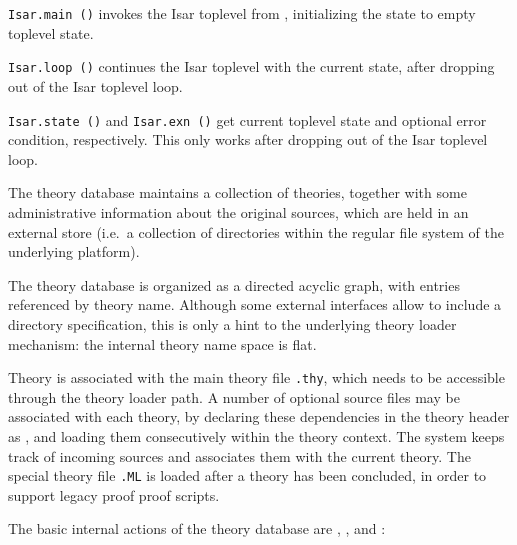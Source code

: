 \begin{isabellebody}
\begin{isamarkuptext}
  \begin{description}

  \item \verb|Isar.main ()| invokes the Isar toplevel from {\ML},
  initializing the state to empty toplevel state.

  \item \verb|Isar.loop ()| continues the Isar toplevel with the
  current state, after dropping out of the Isar toplevel loop.

  \item \verb|Isar.state ()| and \verb|Isar.exn ()| get current
  toplevel state and optional error condition, respectively.  This
  only works after dropping out of the Isar toplevel loop.

  \end{description}%
\end{isamarkuptext}%
\isamarkuptrue%
%
\endisatagmlref
{\isafoldmlref}%
%
\isadelimmlref
%
\endisadelimmlref
%
\isamarkuptrue%
%
\begin{isamarkuptext}%
The theory database maintains a collection of theories,
  together with some administrative information about the original
  sources, which are held in an external store (i.e.\ a collection of
  directories within the regular file system of the underlying
  platform).

  The theory database is organized as a directed acyclic graph, with
  entries referenced by theory name.  Although some external
  interfaces allow to include a directory specification, this is only
  a hint to the underlying theory loader mechanism: the internal
  theory name space is flat.

  Theory  is associated with the main theory file \verb,.thy,, which needs to be accessible through the theory
  loader path.  A number of optional {\ML} source files may be
  associated with each theory, by declaring these dependencies in the
  theory header as \isa{{\isasymUSES}}, and loading them consecutively
  within the theory context.  The system keeps track of incoming {\ML}
  sources and associates them with the current theory.  The special
  theory {\ML} file \verb,.ML, is loaded after a theory has
  been concluded, in order to support legacy proof {\ML} proof
  scripts.

  The basic internal actions of the theory database are , , and :

  \begin{itemize}


\end{itemize}
\end{isamarkuptext}
\end{isabellebody}

